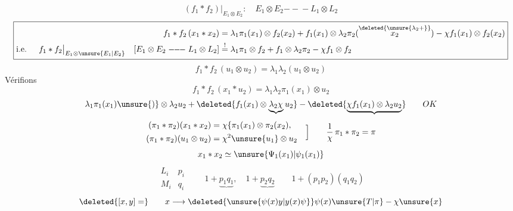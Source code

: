 \[
(f_1*f_2)\big|_{E_1\otimes E_2}:\quad E_1\otimes E_2\mathrel{-\!\!-\!\!-}L_1\otimes L_2
\]
\[
\boxed{\begin{aligned}
f_1*f_2\,(x_1*x_2)&=\lambda_1\pi_1(x_1)\otimes f_2(x_2)
+f_1(x_1)\otimes\lambda_2\pi_2(\overset{\deleted{\unsure{\lambda_2+}}}{x_2})
-\chi f_1(x_1)\otimes f_2(x_2)\\
\text{i.e. }\quad f_1*f_2\big|_{E_1\otimes\unsure{E_1|E_2}}
\quad[E_1\otimes E_2\mathrel{-\!\!-\!\!-}L_1\otimes L_2]
&\overset{!}{=}\lambda_1\pi_1\otimes f_2+f_1\otimes\lambda_2\pi_2-\chi f_1\otimes f_2
\end{aligned}}
\]
\[
f_1*f_2\,(u_1\otimes u_2)=\lambda_1\lambda_2(u_1\otimes u_2)
\]
Vérifions
\[
f_1*f_2\,(x_1*u_2)=\lambda_1\lambda_2\pi_1(x_1)\otimes u_2
\]
\[
\lambda_1\pi_1(x_1)\unsure{)}\otimes\lambda_2u_2+
\deleted{f_1(x_1)\otimes\underbrace{\lambda_2\chi}u_2}
-\deleted{\underbrace{\chi f_1(x_1)\otimes\lambda_2u_2}}
\qquad OK
\]
\[
\begin{aligned}
(\pi_1*\pi_2)(x_1*x_2)&=\chi\{\pi_1(x_1)\otimes\pi_2(x_2),\\
(\pi_1*\pi_2)(u_1\otimes u_2)&=\chi^2\unsure{u_1}\otimes u_2
\end{aligned}\quad\Big]
\qquad\frac1\chi\,\pi_1*\pi_2=\pi
\]
\[
x_1*x_2\simeq\unsure{\Psi_1(x_1)|\psi_1(x_1)}
\]
\[
\begin{array}{cc}
L_i&p_i\\[1em]M_i&q_i
\end{array}
\qquad1+\underbrace{p_1q_1},\quad1+\underbrace{p_2q_2}
\qquad1+(p_1p_2)(q_1q_2)
\]
\[
\deleted{[x,y]=}\qquad
x\longrightarrow\deleted{\unsure{\psi(x)y|y(x)\psi}}
\psi(x)\unsure{T|\pi}-\chi\unsure{x}
\]
